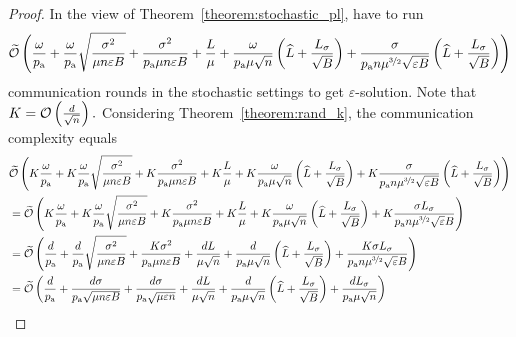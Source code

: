 \documentclass{article}
\newcommand{\algorithmname}{DARIA}
\newcommand*{\probavailable}{\ensuremath{p_{\textnormal{a}}}}
\begin{document}
    \begin{proof}
      In the view of Theorem~\ref{theorem:stochastic_pl}, \algname{\algorithmname} have to run
      \begin{align*}
        \widetilde{\cO}\left(\frac{\omega}{\probavailable} + \frac{\omega}{\probavailable}\sqrt{\frac{\sigma^2}{\mu n \varepsilon B}} + \frac{\sigma^2}{\probavailable \mu n \varepsilon B} + \frac{L}{\mu} + \frac{\omega}{\probavailable \mu \sqrt{n}} \left(\widehat{L} + \frac{L_{\sigma}}{\sqrt{B}}\right) + \frac{\sigma}{\probavailable n \mu^{\nicefrac{3}{2}} \sqrt{\varepsilon B}}\left(\widehat{L} + \frac{L_{\sigma}}{\sqrt{B}}\right)\right)
      \end{align*}
    communication rounds in the stochastic settings to get $\varepsilon$-solution. Note that $K = \mathcal{O}\left(\frac{d}{\sqrt{n}}\right).$ Considering Theorem~\ref{theorem:rand_k}, the communication complexity equals 
    \begin{align*}
      &\widetilde{\cO}\left(K\frac{\omega}{\probavailable} + K\frac{\omega}{\probavailable}\sqrt{\frac{\sigma^2}{\mu n \varepsilon B}} + K\frac{\sigma^2}{\probavailable \mu n \varepsilon B} + K\frac{L}{\mu} + K\frac{\omega}{\probavailable \mu \sqrt{n}} \left(\widehat{L} + \frac{L_{\sigma}}{\sqrt{B}}\right) + K\frac{\sigma}{\probavailable n \mu^{\nicefrac{3}{2}} \sqrt{\varepsilon B}}\left(\widehat{L} + \frac{L_{\sigma}}{\sqrt{B}}\right)\right) \\
      &=\widetilde{\cO}\left(K\frac{\omega}{\probavailable} + K\frac{\omega}{\probavailable}\sqrt{\frac{\sigma^2}{\mu n \varepsilon B}} + K\frac{\sigma^2}{\probavailable \mu n \varepsilon B} + K\frac{L}{\mu} + K\frac{\omega}{\probavailable \mu \sqrt{n}} \left(\widehat{L} + \frac{L_{\sigma}}{\sqrt{B}}\right) + K\frac{\sigma L_{\sigma}}{\probavailable n \mu^{\nicefrac{3}{2}} \sqrt{\varepsilon} B}\right) \\
      &= \widetilde{\cO}\left(\frac{d}{\probavailable} + \frac{d}{\probavailable}\sqrt{\frac{\sigma^2}{\mu n \varepsilon B}} + \frac{K \sigma^2}{\probavailable \mu n \varepsilon B} + \frac{d L}{\mu \sqrt{n}} + \frac{d}{\probavailable \mu \sqrt{n}} \left(\widehat{L} + \frac{L_{\sigma}}{\sqrt{B}}\right) + \frac{K\sigma L_{\sigma}}{\probavailable n \mu^{\nicefrac{3}{2}} \sqrt{\varepsilon} B}\right) \\
      &= \widetilde{\cO}\left(\frac{d}{\probavailable} + \frac{d \sigma}{\probavailable \sqrt{\mu n \varepsilon B}} + \frac{d \sigma}{\probavailable \sqrt{\mu \varepsilon n}} + \frac{d L}{\mu \sqrt{n}} + \frac{d}{\probavailable \mu \sqrt{n}} \left(\widehat{L} + \frac{L_{\sigma}}{\sqrt{B}}\right) + \frac{d L_{\sigma}}{\probavailable \mu \sqrt{n}}\right) \\

\end{align*}
\end{proof}
\end{document}
